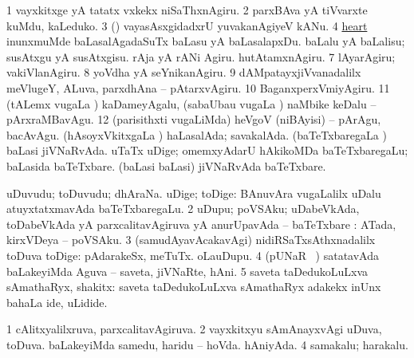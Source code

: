 \noindent 
\gl{\pagu}
\expl{}
\bmng
\bnum
\num{1}  vayxkitxge yA tatatx vxkekx niSaThxnAgiru. 
\num{2}  parxBAva yA tiVvarxte kuMdu, kaLeduko. 
\num{3}  (\AmA) vayasAsxgidadxrU yuvakanAgiyeV kANu. 
\num{4}  \hyperref{kandict_h.pdf}{H}{heart nuga(34)}{heart}  
  
\banum
{} inunxmuMde baLasalAgadaSuTx baLasu yA baLasalapxDu. 
 baLalu yA baLalisu; susAtxgu yA susAtxgisu. 
\eanum
\numie
{}  
\banum
{} rAja yA rANi Agiru. 
 hutAtamxnAgiru. 
\eanum
\numie
\num{7}  lAyarAgiru; vakiVlanAgiru. 
\num{8}  yoVdha yA seYnikanAgiru. 
\num{9}  dAMpatayxjiVvanadalilx meVlugeY, ALuva, parxdhAna -- pAtarxvAgiru. 
\num{10}  BaganxperxVmiyAgiru. 
\num{11}  (tALemx \mo vugaLa \vi) kaDameyAgalu, (sabaUbau \mo vugaLa \vi) naMbike keDalu -- pArxraMBavAgu. 
\num{12}  (parisithxti \mo vugaLiMda) heVgoV (niBAyisi) -- pArAgu, bacAvAgu. 
  
\banum
{} (hAsoyxVkitxgaLa \vi) haLasalAda; savakalAda. 
 (baTeTxbaregaLa \vi) baLasi jiVNaRvAda. 
\eanum
\numie
{}  
\banum
{} uTaTx uDige; omemxyAdarU hAkikoMDa baTeTxbaregaLu; baLasida baTeTxbare. 
 (baLasi baLasi) jiVNaRvAda baTeTxbare. 
\eanum
\numie
\enum
\emng
\eentry

\bentry
{} 
\gl{\nA}
\expl{}
\bmng
\bnum
{} 
\banum
{} uDuvudu; toDuvudu; dhAraNa. 
 uDige; toDige:  BAnuvAra \mo vugaLalilx uDalu atuyxtatxmavAda baTeTxbaregaLu. 
\eanum
\numie
\num{2} uDupu; poVSAku; uDabeVkAda, toDabeVkAda yA parxcalitavAgiruva yA anurUpavAda -- baTeTxbare :  ATada, kirxVDeya -- poVSAku. 
\num{3} (samudAyavAcakavAgi) nidiRSaTxsAthxnadalilx toDuva toDige:  pAdarakeSx, meTuTx.  oLauDupu. 
\num{4} (pUNaR \parx\ ) satatavAda baLakeyiMda Aguva -- saveta, jiVNaRte, hAni. 
\num{5} saveta taDedukoLuLxva sAmathaRyx, shakitx:  saveta taDedukoLuLxva sAmathaRyx adakekx inUnx bahaLa ide, uLidide. 
\enum
\emng

\noindent 
\gl{\pagu}
\expl{}
\bmng
\bnum
\num{1}  cAlitxyalilxruva, parxcalitavAgiruva. 
\num{2}  vayxkitxyu sAmAnayxvAgi uDuva, toDuva. 
  
\banum
{} baLakeyiMda samedu, haridu -- hoVda. 
 hAniyAda. 
\eanum
\numie
\num{4}  samakalu; harakalu. 
\enum
\emng
\eentry

